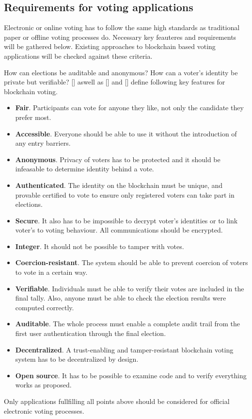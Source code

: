 \subsection{Requirements for voting applications}
\label{sec:req}
Electronic or online voting has to follow the same high standards as traditional paper or offline voting processes do. Necessary key feauteres and requirements will be gathered below. Existing approaches to blockchain based voting applications will be checked against these criteria.\par
How can elections be auditable and anonymous? How can a voter's identity be private but verifiable? [\cite{VARSHNEYA2015}] aswell as [\cite{ERNEST2016}] and [\cite{BORGSTRUP2014}] define following key features for blockchain voting.
\begin{itemize}
\item \textbf{Fair}. Participants can vote for anyone they like, not only the candidate they prefer most.
\item \textbf{Accessible}. Everyone should be able to use it without the introduction of any entry barriers.
\item \textbf{Anonymous}. Privacy of voters has to be protected and it should be infeasable to determine identity behind a vote. %
\item \textbf{Authenticated}. The identity on the blockchain must be unique, and provable certified to vote to ensure only registered voters can take part in elections.
\item \textbf{Secure}. It also has to be impossible to decrypt voter's identities or to link voter's to voting behaviour. All communications should be encrypted.
\item \textbf{Integer}. It should not be possible to tamper with votes.
\item \textbf{Coercion-resistant}. The system should be able to prevent coercion of voters to vote in a certain way.
\item \textbf{Verifiable}. Individuals must be able to verify their votes are included in the final tally. Also, anyone must be able to check the election results were computed correctly.
\item \textbf{Auditable}. The whole process must enable a complete audit trail from the first user authentication through the final election.
\item \textbf{Decentralized}. A trust-enabling and tamper-resistant blockchain voting system has to be decentralized by design.
\item \textbf{Open source}. It has to be possible to examine code and to verify everything works as proposed.
\end{itemize}
Only applications fullfilling all points above should be considered for official electronic voting processes. %
